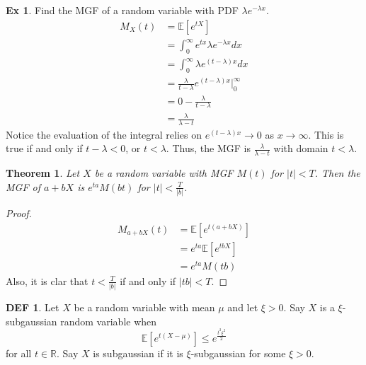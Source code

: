 \documentclass{article}
\newtheorem{theorem}{Theorem}
\theoremstyle{definition}\newtheorem{definition}{DEF}
\theoremstyle{definition}\newtheorem{example}{Ex}
\theoremstyle{lemma}\newtheorem{lemma}{Lemma}
\theoremstyle{corrolary}\newtheorem{corrolary}{Cor}
\begin{document}
\begin{example}
Find the MGF of a random variable with PDF $\lambda e^{-\lambda x}$.
\begin{align*}
M_X(t)&=\mathbb{E}[e^{tX}]\\
&=\int_0^\infty e^{tx} \lambda e^{-\lambda x} dx\\
&= \int_0^\infty \lambda e^{(t-\lambda)x}dx\\
&= \frac{\lambda}{t-\lambda} e^{(t-\lambda)x}|_0^\infty\\
&= 0-\frac{\lambda}{t-\lambda}\\
&= \frac{\lambda}{\lambda -t}
\end{align*}
Notice the evaluation of the integral relies on $e^{(t-\lambda)x} \rightarrow 0$ as $x \rightarrow \infty$.
This is true if and only if $t-\lambda < 0$, or $t < \lambda$.
Thus, the MGF is $\frac{\lambda}{\lambda-t}$ with domain $t<\lambda$.
\end{example}

\begin{theorem}
Let $X$ be a random variable with MGF $M(t)$ for $|t|<T$.
Then the MGF of $a+bX$ is $e^{ta}M(bt)$ for $|t|<\frac{T}{|b|}$.
\end{theorem}
\begin{proof}
\begin{align*}
M_{a+bX}(t) &= \mathbb{E}[e^{t(a+bX)}]\\
&= e^{ta}\mathbb{E}[e^{tbX}]\\
&= e^{ta} M(tb)
\end{align*}
Also, it is clar that $t<\frac{T}{|b|}$ if and only if $|tb|<T$.
\end{proof}

\begin{definition}
Let $X$ be a random variable with mean $\mu$ and let $\xi>0$.
Say $X$ is a $\xi$-subgaussian random variable when
\begin{equation}
\mathbb{E}[e^{t(X-\mu)}]\leq e^\frac{t^2\xi^2}{2}
\end{equation}
for all $t\in \mathbb{R}$.
Say $X$ is subgaussian if it is $\xi$-subgaussian for some $\xi>0$.
\end{definition}
\end{document}
